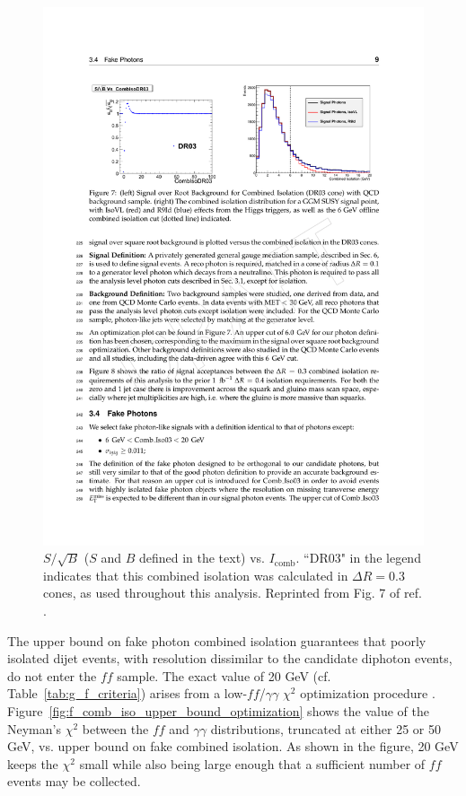 \documentclass[dissertation.tex]{subfiles}
\begin{document}
\begin{figure}
	\centering
	\includegraphics[scale=1.5]{Icomb_optimization}
	\caption{$S/\sqrt{B}$ ($S$ and $B$ defined in the text) vs. $I_{\mathrm{comb}}$.  ``DR03" in the legend indicates that this combined isolation was calculated in $\Delta R = 0.3$ cones, as used throughout this analysis.  Reprinted from Fig. 7 of ref. \cite{CMS_AN-2011-515}.}
	\label{fig:Icomb_optimization}
\end{figure}

The upper bound on fake photon combined isolation guarantees that poorly isolated dijet events, with \MET resolution dissimilar to the candidate diphoton events, do not enter the $\mathit{ff}$ sample.  The exact value of 20 GeV (cf. Table~\ref{tab:g_f_criteria}) arises from a low-\MET $\mathit{ff}$/$\gamma\gamma$ $\chi^{2}$ optimization procedure \cite{CMS_AN-2011-515}.  Figure~\ref{fig:f_comb_iso_upper_bound_optimization} shows the value of the Neyman's $\chi^{2}$ between the $\mathit{ff}$ and $\gamma\gamma$ \MET distributions, truncated at either 25 or 50 GeV, vs. upper bound on fake combined isolation.  As shown in the figure, 20 GeV keeps the $\chi^{2}$ small while also being large enough that a sufficient number of $\mathit{ff}$ events may be collected.
\end{document}
